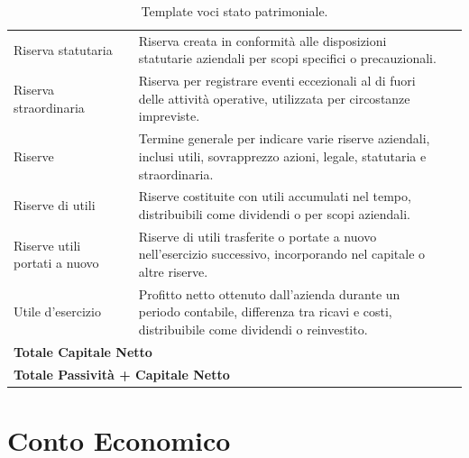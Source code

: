 \documentclass{article}
\newcommand{\RiservaStatutaria}{Riserva creata in conformità alle disposizioni statutarie aziendali per scopi specifici o precauzionali.}
\newcommand{\RiservaStraordinaria}{Riserva per registrare eventi eccezionali al di fuori delle attività operative, utilizzata per circostanze impreviste.}
\newcommand{\Riserve}{Termine generale per indicare varie riserve aziendali, inclusi utili, sovrapprezzo azioni, legale, statutaria e straordinaria.}
\newcommand{\RiserveUtili}{Riserve costituite con utili accumulati nel tempo, distribuibili come dividendi o per scopi aziendali.}
\newcommand{\RiserveUtiliPortatiANuovo}{Riserve di utili trasferite o portate a nuovo nell'esercizio successivo, incorporando nel capitale o altre riserve.}
\newcommand{\UtileEsercizio}{Profitto netto ottenuto dall'azienda durante un periodo contabile, differenza tra ricavi e costi, distribuibile come dividendi o reinvestito.}
\begin{document}
\begin{table}[ht]
{\begin{tabular}{|l|c|l|c|}
            Riserva statutaria                                   &                    & \RiservaStatutaria                    &                 \\
            Riserva straordinaria                                &                    & \RiservaStraordinaria                 &                 \\
            Riserve                                              &                    & \Riserve                              &                 \\
            Riserve di utili                                     &                    & \RiserveUtili                         &                 \\
            Riserve utili portati a nuovo                        &                    & \RiserveUtiliPortatiANuovo            &                 \\
            Utile d'esercizio                                    &                    & \UtileEsercizio                       &                 \\
            \hline
            \multicolumn{4}{|l|}{\textbf{Totale Capitale Netto}}                                                                                \\
            \hline
            \multicolumn{4}{|l|}{\textbf{Totale Passività + Capitale Netto}}                                                                    \\
            \hline
        \end{tabular}

    }
    \caption{Template voci stato patrimoniale.}
\end{table}
\newpage
\setlength{\extrarowheight}{5pt}
\section{Conto Economico}
\end{document}
